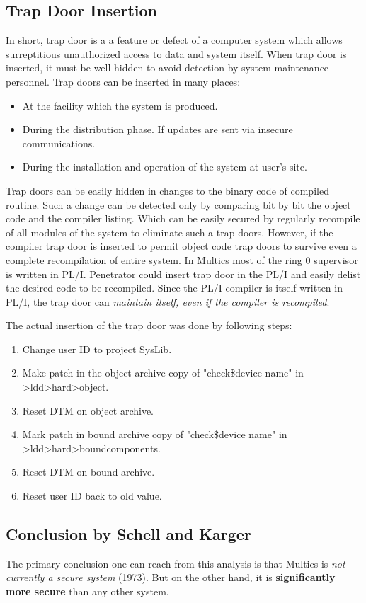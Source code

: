 \subsection{Trap Door Insertion}

In short, trap door is a a feature or defect of a computer system which allows surreptitious unauthorized 
access to data and system itself. When trap door is inserted, it must be well hidden to avoid detection by system
maintenance personnel.
Trap doors can be inserted in many places:
\begin{itemize}
    \item At the facility which the system is produced.
    \item During the distribution phase. If updates are sent via insecure communications.
    \item During the installation and operation of the system at user's site.
\end{itemize}

Trap doors can be easily hidden in changes to the binary code of compiled routine. Such a change can be 
detected only by comparing bit by bit the object code and the compiler listing. Which can be easily secured 
by regularly recompile of all modules of the system to eliminate such a trap doors.
However, if the compiler trap door is inserted to permit object code trap doors to survive even a complete 
recompilation of entire system. 
In Multics most of the ring 0 supervisor is written in PL/I. Penetrator could insert trap door in the PL/I and 
easily delist the desired code to be recompiled.
Since the PL/I compiler is itself written in PL/I, the trap door can \textit{maintain itself, even if the 
compiler is recompiled}.

The actual insertion of the trap door was done by following steps:
\begin{enumerate}
    \item Change user ID to project SysLib.
    \item Make patch in the object archive copy of "check\$device\underline{} name" in >ldd>hard>object.
    \item Reset DTM on object archive.
    \item Mark patch in bound archive copy of "check\$device\underline{} name" in >ldd>hard>bound\underline{}components.
    \item Reset DTM on bound archive.
    \item Reset user ID back to old value.
\end{enumerate}

\subsection{Conclusion by Schell and Karger}

The primary conclusion one can reach from this analysis is that Multics is \textit{not currently a secure system} (1973).
But on the other hand, it is \textbf{significantly more secure} than any other system.

